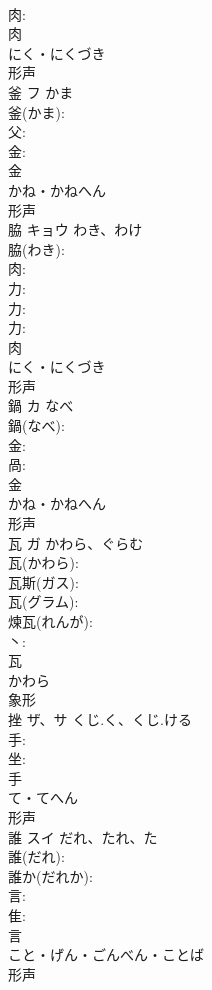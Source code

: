 \documentclass[8pt]{extreport}
\begin{document}
\begin{CJK}{UTF8}{min}
\\	肉: 
\\	肉	
\\	にく・にくづき	
\\	形声 
\\	釜	フ	かま		
\\	釜(かま): 
\\	父: 
\\	金: 
\\	金	
\\	かね・かねへん	
\\	形声 
\\	脇	キョウ	わき、わけ		
\\	脇(わき): 
\\	肉: 
\\	力: 
\\	力: 
\\	力: 
\\	肉	
\\	にく・にくづき	
\\	形声 
\\	鍋	カ	なべ		
\\	鍋(なべ): 
\\	金: 
\\	咼: 
\\	金	
\\	かね・かねへん	
\\	形声 
\\	瓦	ガ	かわら、ぐらむ		
\\	瓦(かわら): 
\\	瓦斯(ガス): 
\\	瓦(グラム): 
\\	煉瓦(れんが): 
\\	丶: 
\\	瓦	
\\	かわら	
\\	象形 
\\	挫	ザ、サ	くじ.く、くじ.ける		
\\	手: 
\\	坐: 
\\	手	
\\	て・てへん	
\\	形声 
\\	誰	スイ	だれ、たれ、た		
\\	誰(だれ): 
\\	誰か(だれか): 
\\	言: 
\\	隹: 
\\	言	
\\	こと・げん・ごんべん・ことば	
\\	形声 

\end{CJK}
\end{document}
